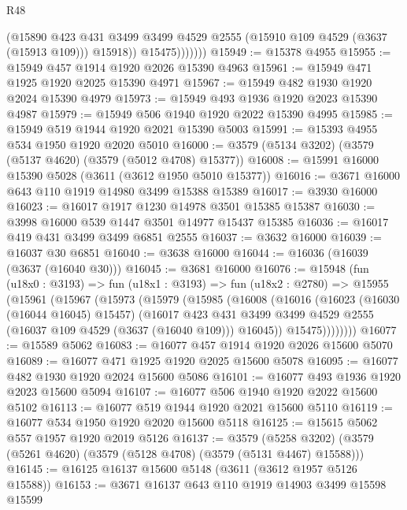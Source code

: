\begin{lexlean}{R48}
\begin{coremodule}
                    (@15890
                      @423
                      @431
                      @3499
                      @3499
                      @4529
                      @2555
                      (@15910 @109 @4529 (@3637 (@15913 @109)))
                      @15918))
                  @15475)))))))
@15949 := @15378 @4955
@15955 := @15949 @457 @1914 @1920 @2026 @15390 @4963
@15961 := @15949 @471 @1925 @1920 @2025 @15390 @4971
@15967 := @15949 @482 @1930 @1920 @2024 @15390 @4979
@15973 := @15949 @493 @1936 @1920 @2023 @15390 @4987
@15979 := @15949 @506 @1940 @1920 @2022 @15390 @4995
@15985 := @15949 @519 @1944 @1920 @2021 @15390 @5003
@15991 := @15393 @4955 @534 @1950 @1920 @2020 @5010
@16000 := @3579 (@5134 @3202) (@3579 (@5137 @4620) (@3579 (@5012 @4708) @15377))
@16008 := @15991 @16000 @15390 @5028 (@3611 (@3612 @1950 @5010 @15377))
@16016 := @3671 @16000 @643 @110 @1919 @14980 @3499 @15388 @15389
@16017 := @3930 @16000
@16023 := @16017 @1917 @1230 @14978 @3501 @15385 @15387
@16030 := @3998 @16000 @539 @1447 @3501 @14977 @15437 @15385
@16036 := @16017 @419 @431 @3499 @3499 @6851 @2555
@16037 := @3632 @16000
@16039 := @16037 @30 @6851
@16040 := @3638 @16000
@16044 := @16036 (@16039 (@3637 (@16040 @30)))
@16045 := @3681 @16000
@16076 := @15948
    (fun (u18x0 : @3193) =>
    fun (u18x1 : @3193) =>
    fun (u18x2 : @2780) =>
    @15955
      (@15961
        (@15967
          (@15973
            (@15979
              (@15985
                (@16008
                  (@16016
                    (@16023
                      (@16030 (@16044 @16045) @15457)
                      (@16017
                        @423
                        @431
                        @3499
                        @3499
                        @4529
                        @2555
                        (@16037 @109 @4529 (@3637 (@16040 @109)))
                        @16045))
                    @15475))))))))
@16077 := @15589 @5062
@16083 := @16077 @457 @1914 @1920 @2026 @15600 @5070
@16089 := @16077 @471 @1925 @1920 @2025 @15600 @5078
@16095 := @16077 @482 @1930 @1920 @2024 @15600 @5086
@16101 := @16077 @493 @1936 @1920 @2023 @15600 @5094
@16107 := @16077 @506 @1940 @1920 @2022 @15600 @5102
@16113 := @16077 @519 @1944 @1920 @2021 @15600 @5110
@16119 := @16077 @534 @1950 @1920 @2020 @15600 @5118
@16125 := @15615 @5062 @557 @1957 @1920 @2019 @5126
@16137 := @3579
    (@5258 @3202)
    (@3579 (@5261 @4620) (@3579 (@5128 @4708) (@3579 (@5131 @4467) @15588)))
@16145 := @16125 @16137 @15600 @5148 (@3611 (@3612 @1957 @5126 @15588))
@16153 := @3671 @16137 @643 @110 @1919 @14903 @3499 @15598 @15599

\end{coremodule}
\end{lexlean}
